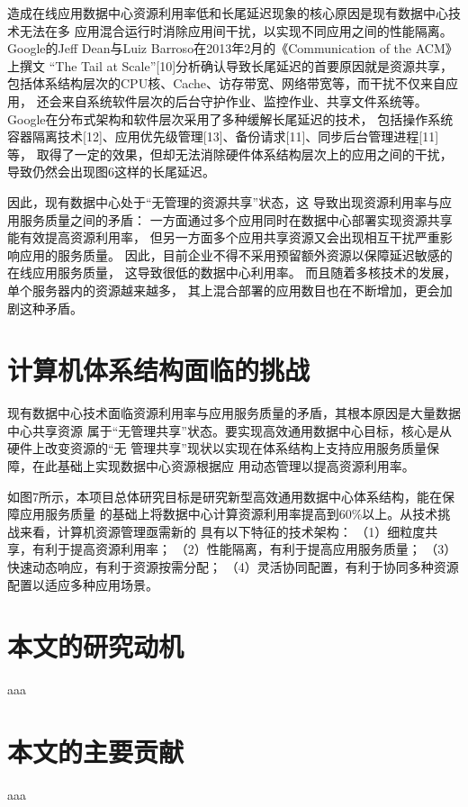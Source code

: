 造成在线应用数据中心资源利用率低和长尾延迟现象的核心原因是现有数据中心技术无法在多
应用混合运行时消除应用间干扰，以实现不同应用之间的性能隔离。
Google的Jeff Dean与Luiz Barroso在2013年2月的《Communication of the ACM》上撰文
“The Tail at Scale”[10]分析确认导致长尾延迟的首要原因就是资源共享，
包括体系结构层次的CPU核、Cache、访存带宽、网络带宽等，而干扰不仅来自应用，
还会来自系统软件层次的后台守护作业、监控作业、共享文件系统等。
Google在分布式架构和软件层次采用了多种缓解长尾延迟的技术，
包括操作系统容器隔离技术[12]、应用优先级管理[13]、备份请求[11]、同步后台管理进程[11]等，
取得了一定的效果，但却无法消除硬件体系结构层次上的应用之间的干扰，
导致仍然会出现图6这样的长尾延迟。

因此，现有数据中心处于“无管理的资源共享”状态，这
导致出现资源利用率与应用服务质量之间的矛盾：
一方面通过多个应用同时在数据中心部署实现资源共享能有效提高资源利用率，
但另一方面多个应用共享资源又会出现相互干扰严重影响应用的服务质量。
因此，目前企业不得不采用预留额外资源以保障延迟敏感的在线应用服务质量，
这导致很低的数据中心利用率。
而且随着多核技术的发展，单个服务器内的资源越来越多，
其上混合部署的应用数目也在不断增加，更会加剧这种矛盾。


\section{计算机体系结构面临的挑战}

现有数据中心技术面临资源利用率与应用服务质量的矛盾，其根本原因是大量数据中心共享资源
属于“无管理共享”状态。要实现高效通用数据中心目标，核心是从硬件上改变资源的“无
管理共享”现状以实现在体系结构上支持应用服务质量保障，在此基础上实现数据中心资源根据应
用动态管理以提高资源利用率。

如图7所示，本项目总体研究目标是研究新型高效通用数据中心体系结构，能在保障应用服务质量
的基础上将数据中心计算资源利用率提高到60\%以上。从技术挑战来看，计算机资源管理亟需新的
具有以下特征的技术架构：
（1）细粒度共享，有利于提高资源利用率；
（2）性能隔离，有利于提高应用服务质量；
（3）快速动态响应，有利于资源按需分配；
（4）灵活协同配置，有利于协同多种资源配置以适应多种应用场景。


\section{本文的研究动机}
aaa

\section{本文的主要贡献}
aaa


